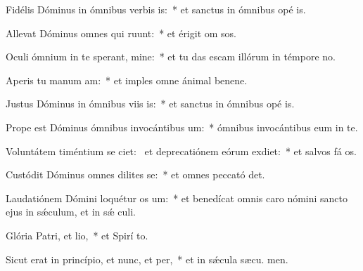 \item Fidélis Dóminus in ómnibus verbis is:~* et sanctus in ómnibus opé is.
\item Allevat Dóminus omnes qui ruunt:~* et érigit om sos.
\item Oculi ómnium in te sperant, mine:~* et tu das escam illórum in témpore no.
\item Aperis tu manum am:~* et imples omne ánimal benene.
\item Justus Dóminus in ómnibus viis is:~* et sanctus in ómnibus opé is.
\item Prope est Dóminus ómnibus invocántibus um:~* ómnibus invocántibus eum in te.
\item Voluntátem timéntium se ciet:~\pscross{} et deprecatiónem eórum exdiet:~* et salvos fá os.
\item Custódit Dóminus omnes dilites se:~* et omnes peccató det.
\item Laudatiónem Dómini loquétur os um:~* et benedícat omnis caro nómini sancto ejus in sǽculum, et in sǽ culi.
\item Glória Patri, et lio,~* et Spirí to.
\item Sicut erat in princípio, et nunc, et per,~* et in sǽcula sæcu. men.
